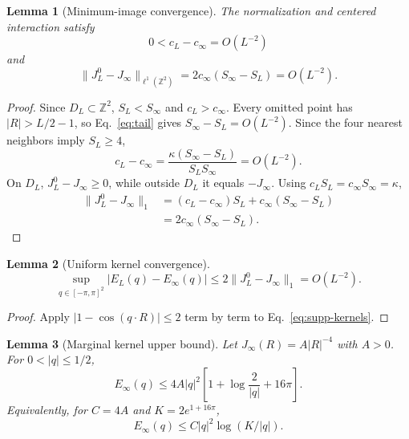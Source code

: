 \documentclass[aps,prb,preprint,notitlepage,groupedaddress,amsmath,amssymb,
               superscriptaddress,nofootinbib,floatfix]{revtex4-2}
\theoremstyle{definition}
\theoremstyle{plain}
\newtheorem{lemma}{Lemma}
\begin{document}
\begin{lemma}[Minimum-image convergence]
The normalization and centered interaction satisfy
\begin{equation}
 0<c_L-c_\infty=O(L^{-2})
 \label{eq:c-convergence}
\end{equation}
and
\begin{equation}
 \boxed{\displaystyle
 \|J_L^0-J_\infty\|_{\ell^1(\mathbb Z^2)}
 =2c_\infty(S_\infty-S_L)=O(L^{-2}).}
 \label{eq:J-convergence}
\end{equation}
\end{lemma}

\begin{proof}
Since $D_L\subset\mathbb Z^2$, $S_L<S_\infty$ and $c_L>c_\infty$.
Every omitted point has $|R|>L/2-1$, so Eq.~\eqref{eq:tail} gives
$S_\infty-S_L=O(L^{-2})$.  Since the four nearest neighbors imply
$S_L\ge4$,
\begin{equation}
 c_L-c_\infty
 =\frac{\kappa(S_\infty-S_L)}{S_LS_\infty}
 =O(L^{-2}).
\end{equation}
On $D_L$, $J_L^0-J_\infty\ge0$, while outside $D_L$ it equals
$-J_\infty$.  Using $c_LS_L=c_\infty S_\infty=\kappa$,
\begin{align}
 \|J_L^0-J_\infty\|_1
 &=(c_L-c_\infty)S_L+c_\infty(S_\infty-S_L)\nonumber\\
 &=2c_\infty(S_\infty-S_L).
\end{align}
\end{proof}

\begin{lemma}[Uniform kernel convergence]
\begin{equation}
 \boxed{\displaystyle
 \sup_{q\in[-\pi,\pi]^2}|E_L(q)-E_\infty(q)|
 \le2\|J_L^0-J_\infty\|_1=O(L^{-2}).}
 \label{eq:uniform-kernel}
\end{equation}
\end{lemma}

\begin{proof}
Apply $|1-\cos(q\cdot R)|\le2$ term by term to
Eq.~\eqref{eq:supp-kernels}.
\end{proof}

\begin{lemma}[Marginal kernel upper bound]
Let $J_\infty(R)=A|R|^{-4}$ with $A>0$.  For $0<|q|\le1/2$,
\begin{equation}
 \boxed{\displaystyle
 E_\infty(q)\le
 4A|q|^2\left[1+\log\frac2{|q|}+16\pi\right].}
 \label{eq:kernel-upper}
\end{equation}
Equivalently, for $C=4A$ and $K=2e^{1+16\pi}$,
\begin{equation}
 E_\infty(q)\le C|q|^2\log(K/|q|).
\end{equation}
\end{lemma}
\end{document}
